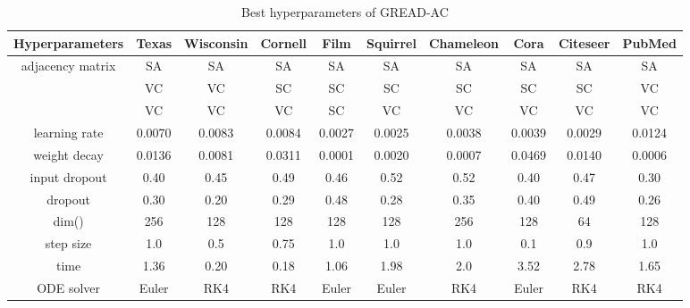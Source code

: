 \documentclass{article}
\theoremstyle{plain}
\theoremstyle{definition}
\theoremstyle{remark}
\begin{document}
\begin{table*}[ht!]
    \centering
    \small
    \caption{Best hyperparameters of GREAD-AC}
    \label{tab:best_AC}
    \begin{tabular}{c ccccccccc} \toprule
        Hyperparameters  & Texas  & Wisconsin 
                                           & Cornell& Film   & Squirrel 
                                                                      & Chameleon
                                                                               & Cora   & Citeseer 
                                                                                                 & PubMed\\ \midrule
        adjacency matrix & SA     & SA     & SA     & SA     & SA     & SA     & SA     & SA     & SA    \\
                 & VC     & VC     & SC     & SC     & SC     & SC     & SC     & SC     & VC    \\
                  & VC     & VC     & VC     & SC     & VC     & VC     & VC     & VC     & VC    \\
        learning rate    & 0.0070 & 0.0083 & 0.0084 & 0.0027 & 0.0025 & 0.0038 & 0.0039 & 0.0029 & 0.0124\\
        weight decay     & 0.0136 & 0.0081 & 0.0311 & 0.0001 & 0.0020 & 0.0007 & 0.0469 & 0.0140 & 0.0006\\
        input dropout    & 0.40   & 0.45   & 0.49   & 0.46   & 0.52   & 0.52   & 0.40   & 0.47   & 0.30\\
        dropout          & 0.30   & 0.20   & 0.29   & 0.48   & 0.28   & 0.35   & 0.40   & 0.49   & 0.26\\
        dim()& 256    & 128    & 128    & 128    & 128    & 256    & 128    & 64     & 128\\
        step size  & 1.0    & 0.5    & 0.75   & 1.0    & 1.0    & 1.0    & 0.1    & 0.9    & 1.0\\
        time          & 1.36   & 0.20   & 0.18   & 1.06   & 1.98   & 2.0    & 3.52   & 2.78   & 1.65\\
        ODE solver       & Euler  & RK4    & RK4    & Euler  & Euler  & RK4    & Euler    & RK4    & RK4  \\
        \bottomrule
    \end{tabular}
\end{table*}
\end{document}
